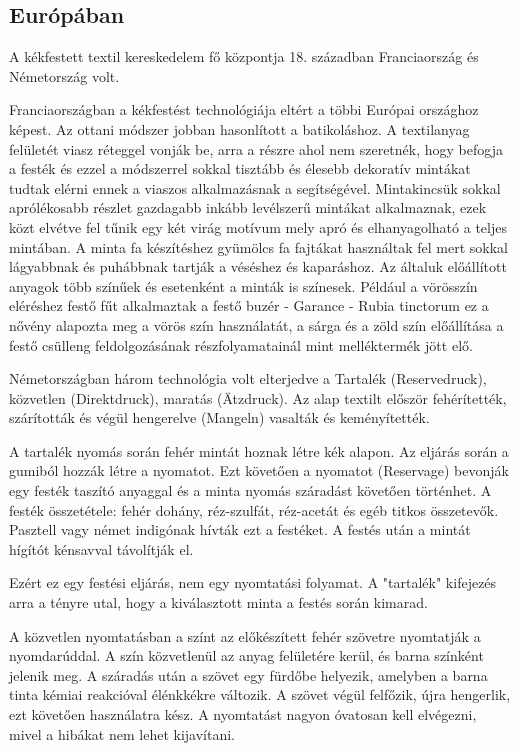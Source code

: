\documentclass[fontsize=12pt, appendixprefix=true]{scrreprt}
\begin{document}
\subsection{Európában}
A kékfestett textil kereskedelem fő központja 18. században Franciaország  és Németország volt.

\vspace*{3 mm}
Franciaországban a kékfestést technológiája eltért a többi Európai országhoz képest. Az ottani módszer jobban hasonlított a batikoláshoz. A textilanyag felületét viasz réteggel vonják be, arra a részre ahol nem szeretnék, hogy befogja a festék és ezzel a módszerrel sokkal tisztább és élesebb dekoratív mintákat tudtak elérni ennek a viaszos alkalmazásnak a segítségével.
Mintakincsük sokkal aprólékosabb részlet gazdagabb inkább levélszerű mintákat alkalmaznak, ezek közt elvétve fel tűnik egy két virág motívum mely apró és elhanyagolható a teljes mintában.
A minta fa készítéshez gyümölcs fa fajtákat használtak fel mert sokkal lágyabbnak és puhábbnak tartják a véséshez és kaparáshoz. Az általuk előállított anyagok több színűek és esetenként a minták is színesek.
Például a vörösszín eléréshez festő fűt alkalmaztak a festő buzér - Garance - Rubia tinctorum  ez a nővény alapozta meg a vörös szín használatát, 
a sárga és a zöld szín előállítása a festő csülleng feldolgozásának részfolyamatainál mint melléktermék jött elő.

\vspace*{3 mm}
Németországban három technológia volt elterjedve a Tartalék (Reservedruck), közvetlen (Direktdruck), maratás (Ätzdruck). Az alap textilt először fehérítették, szárították és végül hengerelve (Mangeln) vasalták és keményítették.

A tartalék nyomás során fehér mintát hoznak létre kék alapon. Az eljárás során a gumiból hozzák létre a nyomatot. Ezt követően a nyomatot (Reservage) bevonják egy festék taszító anyaggal és a minta nyomás száradást követően történhet. A festék összetétele: fehér dohány, réz-szulfát, réz-acetát és egéb titkos összetevők. Pasztell vagy német indigónak hívták ezt a festéket. A festés után a mintát hígítót kénsavval távolítják el.

Ezért ez egy festési eljárás, nem egy nyomtatási folyamat. A "tartalék" kifejezés arra a tényre utal, hogy a kiválasztott minta a festés során kimarad.

A közvetlen nyomtatásban a színt az előkészített fehér szövetre nyomtatják a nyomdarúddal. A szín közvetlenül az anyag felületére kerül, és barna színként jelenik meg. A száradás után a szövet egy fürdőbe helyezik, amelyben a barna tinta kémiai reakcióval élénkkékre változik. A szövet végül felfőzik, újra hengerlik, ezt követően használatra kész. A nyomtatást nagyon óvatosan kell elvégezni, mivel a hibákat nem lehet kijavítani.
\end{document}
